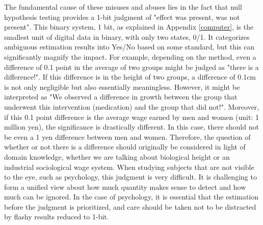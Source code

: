 \documentclass{ltjsbook}
\begin{document}
The fundamental cause of these misuses and abuses lies in the fact that null hypothesis testing provides a 1-bit judgment of "effect was present, was not present". This binary system, 1 bit, as explained in Appendix \ref{computer}, is the smallest unit of digital data in binary, with only two states, 0/1. It categorizes ambiguous estimation results into Yes/No based on some standard, but this can significantly magnify the impact. For example, depending on the method, even a difference of 0.1 point in the average of two groups might be judged as "there is a difference!". If this difference is in the height of two groups, a difference of 0.1cm is not only negligible but also essentially meaningless. However, it might be interpreted as "We observed a difference in growth between the group that underwent this intervention (medication) and the group that did not!". Moreover, if this 0.1 point difference is the average wage earned by men and women (unit: 1 million yen), the significance is drastically different. In this case, there should not be even a 1 yen difference between men and women. Therefore, the question of whether or not there is a difference should originally be considered in light of domain knowledge, whether we are talking about biological height or an industrial sociological wage system. When studying subjects that are not visible to the eye, such as psychology, this judgment is very difficult. It is challenging to form a unified view about how much quantity makes sense to detect and how much can be ignored. In the case of psychology, it is essential that the estimation before the judgment is prioritized, and care should be taken not to be distracted by flashy results reduced to 1-bit.
\end{document}
